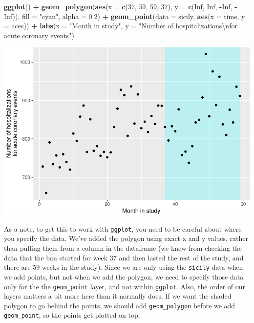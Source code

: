 \documentclass[
]{book}
\newenvironment{Shaded}{\begin{snugshade}}{\end{snugshade}}
\newcommand{\CharTok}[1]{\textcolor[rgb]{0.31,0.60,0.02}{#1}}
\newcommand{\DataTypeTok}[1]{\textcolor[rgb]{0.13,0.29,0.53}{#1}}
\newcommand{\DecValTok}[1]{\textcolor[rgb]{0.00,0.00,0.81}{#1}}
\newcommand{\FloatTok}[1]{\textcolor[rgb]{0.00,0.00,0.81}{#1}}
\newcommand{\KeywordTok}[1]{\textcolor[rgb]{0.13,0.29,0.53}{\textbf{#1}}}
\newcommand{\NormalTok}[1]{#1}
\newcommand{\OperatorTok}[1]{\textcolor[rgb]{0.81,0.36,0.00}{\textbf{#1}}}
\newcommand{\OtherTok}[1]{\textcolor[rgb]{0.56,0.35,0.01}{#1}}
\newcommand{\StringTok}[1]{\textcolor[rgb]{0.31,0.60,0.02}{#1}}
\begin{document}
\begin{Shaded}
\begin{Highlighting}[]
\KeywordTok{ggplot}\NormalTok{() }\OperatorTok{+}\StringTok{ }
\StringTok{  }\KeywordTok{geom_polygon}\NormalTok{(}\KeywordTok{aes}\NormalTok{(}\DataTypeTok{x =} \KeywordTok{c}\NormalTok{(}\DecValTok{37}\NormalTok{, }\DecValTok{59}\NormalTok{, }\DecValTok{59}\NormalTok{, }\DecValTok{37}\NormalTok{), }
                   \DataTypeTok{y =} \KeywordTok{c}\NormalTok{(}\OtherTok{Inf}\NormalTok{, }\OtherTok{Inf}\NormalTok{, }\OperatorTok{-}\OtherTok{Inf}\NormalTok{, }\OperatorTok{-}\OtherTok{Inf}\NormalTok{)), }
               \DataTypeTok{fill =} \StringTok{"cyan"}\NormalTok{, }\DataTypeTok{alpha =} \FloatTok{0.2}\NormalTok{) }\OperatorTok{+}\StringTok{ }
\StringTok{  }\KeywordTok{geom_point}\NormalTok{(}\DataTypeTok{data =}\NormalTok{ sicily, }\KeywordTok{aes}\NormalTok{(}\DataTypeTok{x =}\NormalTok{ time, }\DataTypeTok{y =}\NormalTok{ aces)) }\OperatorTok{+}\StringTok{ }
\StringTok{  }\KeywordTok{labs}\NormalTok{(}\DataTypeTok{x =} \StringTok{"Month in study"}\NormalTok{, }
       \DataTypeTok{y =} \StringTok{"Number of hospitalizations}\CharTok{\textbackslash{}n}\StringTok{for acute coronary events"}\NormalTok{)}
\end{Highlighting}
\end{Shaded}

\includegraphics{adv_epi_analysis_files/figure-latex/unnamed-chunk-124-1.pdf}

As a note, to get this to work with \texttt{ggplot}, you need to be careful about where you specify the data. We've added the polygon using exact x and y values, rather than pulling them from a column in the dataframe (we knew from checking the data that the ban started for week 37 and then lasted the rest of the study, and there are 59 weeks in the study). Since we are only using the \texttt{sicily} data when we add points, but not when we add the polygon, we need to specify those data only for the the \texttt{geom\_point} layer, and not within \texttt{ggplot}. Also, the order of our layers matters a bit more here than it normally does. If we want the shaded polygon to go behind the points, we should add \texttt{geom\_polygon} before we add \texttt{geom\_point}, so the points get plotted on top.
\end{document}
